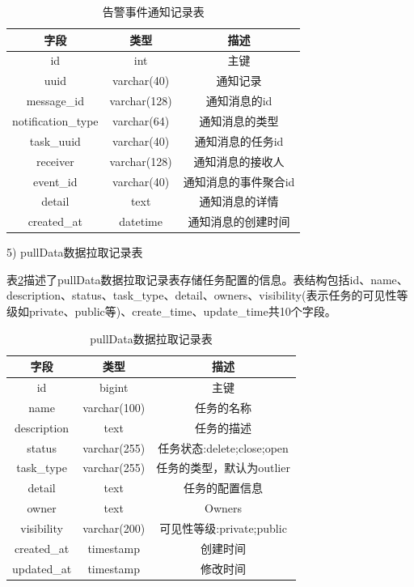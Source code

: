 \begin{longtable}[htbp]
\begin{table}[h] 
\centering
\small
\caption{告警事件通知记录表}
\begin{tabular}{|c|c|c|}  
\hline  
字段 & 类型 & 描述 \\ \hline  
id & int & 主键 \\ \hline  
uuid & varchar(40) & 通知记录 \\ \hline  
message\_id & varchar(128) & 通知消息的id \\ \hline  
notification\_type & varchar(64) & 通知消息的类型 \\ \hline  
task\_uuid & varchar(40) & 通知消息的任务id \\ \hline  
receiver & varchar(128) & 通知消息的接收人 \\ \hline  
event\_id & varchar(40) & 通知消息的事件聚合id \\ \hline  
detail & text & 通知消息的详情 \\ \hline  
created\_at & datetime & 通知消息的创建时间 \\ \hline  
\end{tabular}  
\label{gaojingshijiantongzhitable}
\end{table}

5)	pullData数据拉取记录表

表\ref{pulldatatable}描述了pullData数据拉取记录表存储任务配置的信息。表结构包括id、name、description、status、task\_type、detail、owners、visibility(表示任务的可见性等级如private、public等)、create\_time、update\_time共10个字段。 


\begin{table}[h] 
\centering
\small
\caption{pullData数据拉取记录表}
\begin{tabular}{|c|c|c|}  
\hline  
字段 & 类型 & 描述 \\ \hline  
id & bigint & 主键 \\ \hline  
name & varchar(100) & 任务的名称 \\ \hline  
description & text & 任务的描述 \\ \hline  
status & varchar(255) & 任务状态:delete;close;open \\ \hline  
task\_type & varchar(255) & 任务的类型，默认为outlier \\ \hline  
detail & text & 任务的配置信息 \\ \hline  
owner & text & Owners \\ \hline  
visibility & varchar(200) & 可见性等级:private;public \\ \hline  
created\_at & timestamp & 创建时间 \\ \hline  
updated\_at & timestamp & 修改时间 \\ \hline  
\end{tabular}  
\label{pulldatatable}
\end{table}


\end{longtable}
